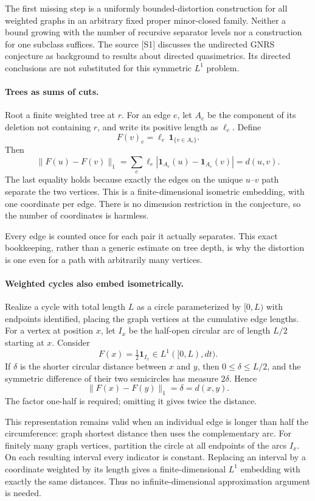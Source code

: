 \documentclass[11pt]{article}
\begin{document}
The first missing step is a uniformly bounded-distortion construction for all weighted graphs in an arbitrary fixed proper minor-closed family. Neither a bound growing with the number of recursive separator levels nor a construction for one subclass suffices. The source [S1] discusses the undirected GNRS conjecture as background to results about directed quasimetrics. Its directed conclusions are not substituted for this symmetric $L^1$ problem.

\paragraph{Trees as sums of cuts.}
Root a finite weighted tree at $r$. For an edge $e$, let $A_e$ be the component of its deletion not containing $r$, and write its positive length as $\ell_e$. Define
\[
 F(v)_e=\ell_e\,\mathbf1_{\{v\in A_e\}}.
\]
Then
\[
 \|F(u)-F(v)\|_1
   =\sum_e\ell_e
       |\mathbf1_{A_e}(u)-\mathbf1_{A_e}(v)|
   =d(u,v).
\]
The last equality holds because exactly the edges on the unique $u$--$v$ path separate the two vertices. This is a finite-dimensional isometric embedding, with one coordinate per edge. There is no dimension restriction in the conjecture, so the number of coordinates is harmless.

Every edge is counted once for each pair it actually separates. This exact bookkeeping, rather than a generic estimate on tree depth, is why the distortion is one even for a path with arbitrarily many vertices.

\paragraph{Weighted cycles also embed isometrically.}
Realize a cycle with total length $L$ as a circle parameterized by $[0,L)$ with endpoints identified, placing the graph vertices at the cumulative edge lengths. For a vertex at position $x$, let $I_x$ be the half-open circular arc of length $L/2$ starting at $x$. Consider
\[
 F(x)=\tfrac12\mathbf1_{I_x}\in L^1([0,L),dt).
\]
If $\delta$ is the shorter circular distance between $x$ and $y$, then $0\le\delta\le L/2$, and the symmetric difference of their two semicircles has measure $2\delta$. Hence
\[
 \|F(x)-F(y)\|_1=\delta=d(x,y).
\]
The factor one-half is required; omitting it gives twice the distance.

This representation remains valid when an individual edge is longer than half the circumference: graph shortest distance then uses the complementary arc. For finitely many graph vertices, partition the circle at all endpoints of the arcs $I_x$. On each resulting interval every indicator is constant. Replacing an interval by a coordinate weighted by its length gives a finite-dimensional $L^1$ embedding with exactly the same distances. Thus no infinite-dimensional approximation argument is needed.
\end{document}
